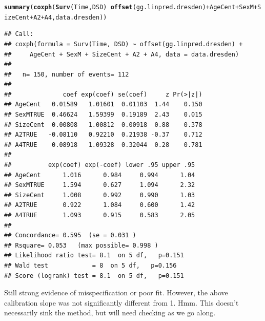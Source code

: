 \documentclass{article}\usepackage[]{graphicx}\usepackage[]{color}
\makeatletter
\newcommand{\hlopt}[1]{\textcolor[rgb]{0,0,0}{#1}}%
\newcommand{\hlstd}[1]{\textcolor[rgb]{0.345,0.345,0.345}{#1}}%
\newcommand{\hlkwd}[1]{\textcolor[rgb]{0.737,0.353,0.396}{\textbf{#1}}}%
\newenvironment{kframe}{%
 \def\at@end@of@kframe{}%
 \ifinner\ifhmode%
  \def\at@end@of@kframe{\end{minipage}}%
  \begin{minipage}{\columnwidth}%
 \fi\fi%
 \def\FrameCommand##1{\hskip\@totalleftmargin \hskip-\fboxsep
 \colorbox{shadecolor}{##1}\hskip-\fboxsep
     \hskip-\linewidth \hskip-\@totalleftmargin \hskip\columnwidth}%
 \MakeFramed {\advance\hsize-\width
   \@totalleftmargin\z@ \linewidth\hsize
   \@setminipage}}%
 {\par\unskip\endMakeFramed%
 \at@end@of@kframe}
\newenvironment{knitrout}{}{} %
\makeatother
\begin{document}
\begin{knitrout}
\begin{kframe}
{\ttfamily\noindent\bfseries\color{errorcolor}{\#\# Error in fitter(X, Y, strats, offset, init, control, weights = weights, : NA/NaN/Inf in foreign function call (arg 6)}}\begin{alltt}
\hlkwd{summary}\hlstd{(}\hlkwd{coxph}\hlstd{(}\hlkwd{Surv}\hlstd{(Time, DSD)} \hlopt{~} \hlkwd{offset}\hlstd{(gg.linpred.dresden)} \hlopt{+} \hlstd{AgeCent} \hlopt{+} \hlstd{SexM} \hlopt{+} \hlstd{SizeCent} \hlopt{+} \hlstd{A2} \hlopt{+} \hlstd{A4, data.dresden))}
\end{alltt}
\begin{verbatim}
## Call:
## coxph(formula = Surv(Time, DSD) ~ offset(gg.linpred.dresden) + 
##     AgeCent + SexM + SizeCent + A2 + A4, data = data.dresden)
## 
##   n= 150, number of events= 112 
## 
##              coef exp(coef) se(coef)     z Pr(>|z|)
## AgeCent   0.01589   1.01601  0.01103  1.44    0.150
## SexMTRUE  0.46624   1.59399  0.19189  2.43    0.015
## SizeCent  0.00808   1.00812  0.00918  0.88    0.378
## A2TRUE   -0.08110   0.92210  0.21938 -0.37    0.712
## A4TRUE    0.08918   1.09328  0.32044  0.28    0.781
## 
##          exp(coef) exp(-coef) lower .95 upper .95
## AgeCent      1.016      0.984     0.994      1.04
## SexMTRUE     1.594      0.627     1.094      2.32
## SizeCent     1.008      0.992     0.990      1.03
## A2TRUE       0.922      1.084     0.600      1.42
## A4TRUE       1.093      0.915     0.583      2.05
## 
## Concordance= 0.595  (se = 0.031 )
## Rsquare= 0.053   (max possible= 0.998 )
## Likelihood ratio test= 8.1  on 5 df,   p=0.151
## Wald test            = 8  on 5 df,   p=0.156
## Score (logrank) test = 8.1  on 5 df,   p=0.151
\end{verbatim}
\end{kframe}
\end{knitrout}
Still strong evidence of misspecification or poor fit.  However, the above calibration slope was not significantly different from 1.  Hmm.  This doesn't necessarily sink the method, but will need checking as we go along.
\end{document}
